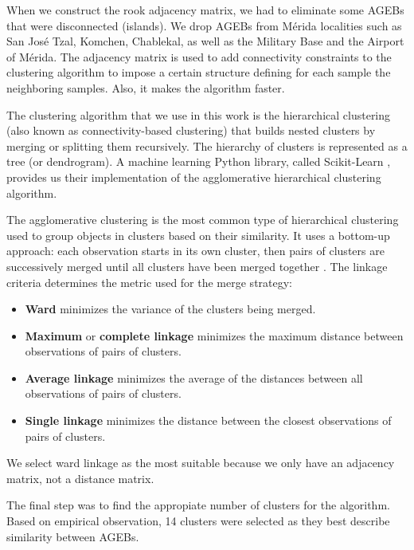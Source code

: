 When we construct the rook adjacency matrix, we had to eliminate some AGEBs that were disconnected (islands). We drop AGEBs from Mérida localities such as San José Tzal, Komchen, Chablekal, as well as the Military Base and the Airport of Mérida. The adjacency matrix is used to add connectivity constraints to the clustering algorithm to impose a certain structure defining for each sample the neighboring samples. Also, it makes the algorithm faster.

The clustering algorithm that we use in this work is the hierarchical clustering (also known as connectivity-based clustering) that builds nested clusters by merging or splitting them recursively. The hierarchy of clusters is represented as a tree (or dendrogram). A machine learning Python library, called Scikit-Learn \cite{scikit-learn}, provides us their implementation of the agglomerative hierarchical clustering algorithm. 

The agglomerative clustering is the most common type of hierarchical clustering used to group objects in clusters based on their similarity. It uses a bottom-up approach: each observation starts in its own cluster, then pairs of clusters are successively merged until all clusters have been merged together \cite{hierarchical_scikit}. The linkage criteria determines the metric used for the merge strategy:

\begin{itemize}
	\item \textbf{Ward} minimizes the variance of the clusters being merged.
	\item \textbf{Maximum} or \textbf{complete linkage} minimizes the maximum distance between observations of pairs of clusters.
	\item \textbf{Average linkage} minimizes the average of the distances between all observations of pairs of clusters.
	\item \textbf{Single linkage} minimizes the distance between the closest observations of pairs of clusters.
\end{itemize}

We select ward linkage as the most suitable because we only have an adjacency matrix, not a distance matrix.

The final step was to find the appropiate number of clusters for the algorithm. Based on empirical observation, 14 clusters were selected as they best describe similarity between AGEBs.

